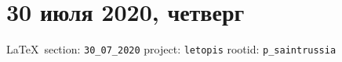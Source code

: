  
 
\section{30 июля 2020, четверг}
\label{sec:30_07_2020}

\vspace{0.5cm}
{\small\LaTeX~section: \verb|30_07_2020| project: \verb|letopis| rootid: \verb|p_saintrussia|}
\vspace{0.5cm}




